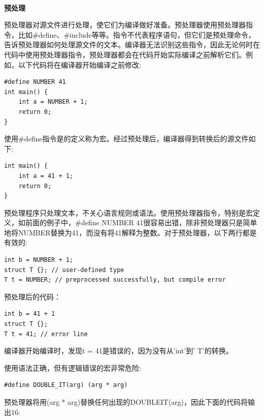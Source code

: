 \noindent\textbf{}\ \par
\textbf{预处理}\ \par
预处理器对源文件进行处理，使它们为编译做好准备。预处理器使用预处理器指令，比如\#define、\#include等等。指令不代表程序语句，但它们是预处理命令，告诉预处理器如何处理源文件的文本。编译器无法识别这些指令，因此无论何时在代码中使用预处理器指令，预处理器都会在代码开始实际编译之前解析它们。例如，以下代码将在编译器开始编译之前修改:\par

\begin{lstlisting}[caption={}]
#define NUMBER 41
int main() {
	int a = NUMBER + 1;
	return 0;
}
\end{lstlisting}

使用\#define指令是的定义称为宏。经过预处理后，编译器得到转换后的源文件如下: \par

\begin{lstlisting}[caption={}]
int main() {
	int a = 41 + 1;
	return 0;
}
\end{lstlisting}

预处理程序只处理文本，不关心语言规则或语法。使用预处理器指令，特别是宏定义，如前面的例子中，\#define NUMBER 41很容易出错，除非预处理器只是简单地将NUMBER替换为41，而没有将41解释为整数。对于预处理器，以下两行都是有效的:\par

\begin{lstlisting}[caption={}]
int b = NUMBER + 1;
struct T {}; // user-defined type
T t = NUMBER; // preprocessed successfully, but compile error
\end{lstlisting}

预处理后的代码： \par

\begin{lstlisting}[caption={}]
int b = 41 + 1
struct T {};
T t = 41; // error line
\end{lstlisting}

编译器开始编译时，发现t = 41是错误的，因为没有从'int'到' T'的转换。\par
使用语法正确，但有逻辑错误的宏非常危险: \par

\begin{lstlisting}[caption={}]
#define DOUBLE_IT(arg) (arg * arg)
\end{lstlisting}

预处理器将用(arg * arg)替换任何出现的DOUBLE\underline{}IT(arg)，因此下面的代码将输出16: \par

